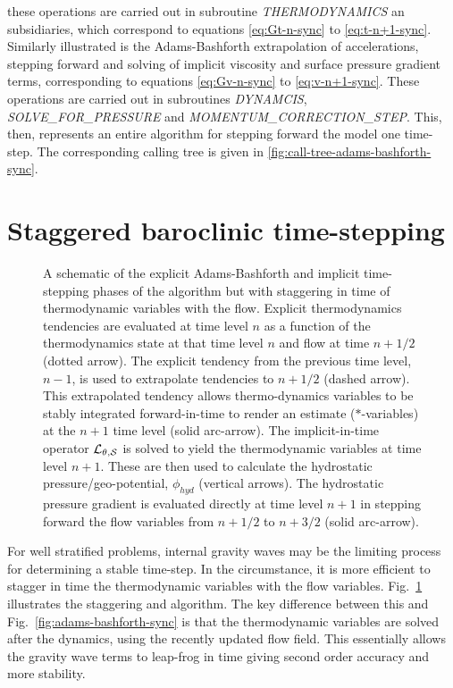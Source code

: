 these operations are carried out in subroutine {\em THERMODYNAMICS} an
subsidiaries, which correspond to equations \ref{eq:Gt-n-sync} to
\ref{eq:t-n+1-sync}.
Similarly illustrated is the Adams-Bashforth extrapolation of
accelerations, stepping forward and solving of implicit viscosity and
surface pressure gradient terms, corresponding to equations
\ref{eq:Gv-n-sync} to \ref{eq:v-n+1-sync}.
These operations are carried out in subroutines {\em DYNAMCIS}, {\em
SOLVE\_FOR\_PRESSURE} and {\em MOMENTUM\_CORRECTION\_STEP}. This, then,
represents an entire algorithm for stepping forward the model one
time-step. The corresponding calling tree is given in
\ref{fig:call-tree-adams-bashforth-sync}.

\section{Staggered baroclinic time-stepping}
\label{sect:adams-bashforth-staggered}

\begin{figure}
\begin{center}
\end{center}
\caption{
A schematic of the explicit Adams-Bashforth and implicit time-stepping
phases of the algorithm but with staggering in time of thermodynamic
variables with the flow. Explicit thermodynamics tendencies are
evaluated at time level $n$ as a function of the thermodynamics
state at that time level $n$ and flow at time $n+1/2$ (dotted arrow). The
explicit tendency from the previous time level, $n-1$, is used to
extrapolate tendencies to $n+1/2$ (dashed arrow). This extrapolated
tendency allows thermo-dynamics variables to be stably integrated
forward-in-time to render an estimate ($*$-variables) at the $n+1$
time level (solid arc-arrow). The implicit-in-time operator ${\cal
L_{\theta,S}}$ is solved to yield the thermodynamic variables at time
level $n+1$. These are then used to calculate the hydrostatic
pressure/geo-potential, $\phi_{hyd}$ (vertical arrows). The
hydrostatic pressure gradient is evaluated directly at time level
$n+1$ in stepping forward the flow variables from $n+1/2$ to $n+3/2$
(solid arc-arrow). }
\label{fig:adams-bashforth-staggered}
\end{figure}

For well stratified problems, internal gravity waves may be the
limiting process for determining a stable time-step. In the
circumstance, it is more efficient to stagger in time the
thermodynamic variables with the flow
variables. Fig.~\ref{fig:adams-bashforth-staggered} illustrates the
staggering and algorithm. The key difference between this and
Fig.~\ref{fig:adams-bashforth-sync} is that the thermodynamic variables 
are solved after the dynamics, using the recently updated flow field.
This essentially allows the gravity wave terms to leap-frog in
time giving second order accuracy and more stability.


